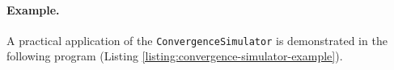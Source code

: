 \paragraph{Example.}
A practical application of the \texttt{ConvergenceSimulator} is demonstrat\-ed
in the following program (Listing \ref{listing:convergence-simulator-example}).


